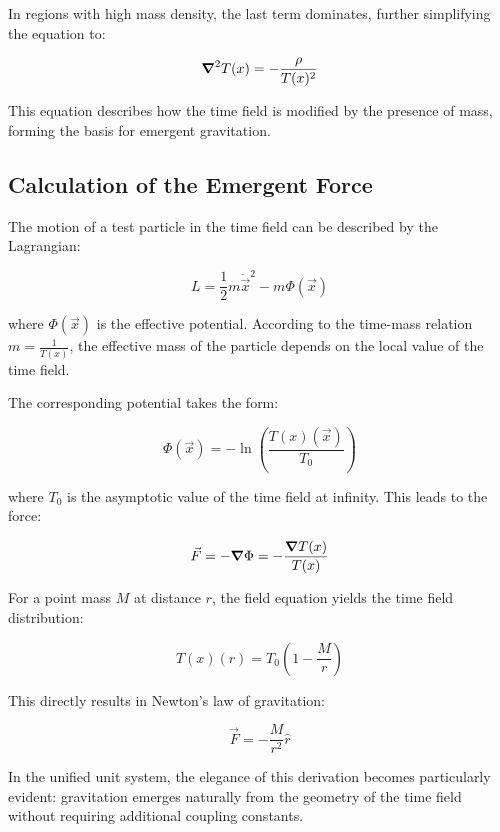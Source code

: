 \documentclass[12pt,a4paper]{article}
\newcommand{\Tfield}{T(x)}
\newcommand{\Tzero}{T_0}
\newcommand{\vecx}{\vec{x}}
\begin{document}
	In regions with high mass density, the last term dominates, further simplifying the equation to:
	
	\begin{equation}
		\grad^2 \Tfield = -\frac{\rho}{\Tfield^2}
	\end{equation}
	
	This equation describes how the time field is modified by the presence of mass, forming the basis for emergent gravitation.
	
	\subsection{Calculation of the Emergent Force}
	The motion of a test particle in the time field can be described by the Lagrangian:
	
	\begin{equation}
		L = \frac{1}{2}m\dot{\vecx}^2 - m\Phi(\vecx)
	\end{equation}
	
	where \(\Phi(\vecx)\) is the effective potential. According to the time-mass relation \(m = \frac{1}{\Tfield}\), the effective mass of the particle depends on the local value of the time field.
	
	The corresponding potential takes the form:
	
	\begin{equation}
		\Phi(\vecx) = -\ln\left(\frac{\Tfield(\vecx)}{\Tzero}\right)
	\end{equation}
	
	where \(\Tzero\) is the asymptotic value of the time field at infinity. This leads to the force:
	
	\begin{equation}
		\vec{F} = -\grad \Phi = -\frac{\grad \Tfield}{\Tfield}
	\end{equation}
	
	For a point mass \(M\) at distance \(r\), the field equation yields the time field distribution:
	
	\begin{equation}
		\Tfield(r) = \Tzero\left(1 - \frac{M}{r}\right)
	\end{equation}
	
	This directly results in Newton’s law of gravitation:
	
	\begin{equation}
		\vec{F} = -\frac{M}{r^2} \hat{r}
	\end{equation}
	
	In the unified unit system, the elegance of this derivation becomes particularly evident: gravitation emerges naturally from the geometry of the time field without requiring additional coupling constants.
	
\end{document}
